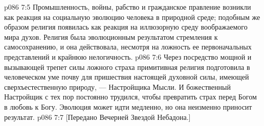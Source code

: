 \vs p086 7:5 \pc Промышленность, войны, рабство и гражданское правление возникли как реакция на социальную эволюцию человека в природной среде; подобным же образом религия появилась как реакция на иллюзорную среду воображаемого мира духов. Религия была эволюционным результатом стремления к самосохранению, и она действовала, несмотря на ложность ее первоначальных представлений и крайнюю нелогичность.
\vs p086 7:6 Через посредство мощной и вызывающей трепет силы ложного страха примитивная религия подготовила в человеческом уме почву для пришествия настоящей духовной силы, имеющей сверхъестественную природу, --- Настройщика Мысли. И божественный Настройщик с тех пор постоянно трудился, чтобы превратить страх перед Богом в любовь к Богу. Эволюция может идти медленно, но она неизменно приносит результат.
\vsetoff
\vs p086 7:7 [Передано Вечерней Звездой Небадона.]
